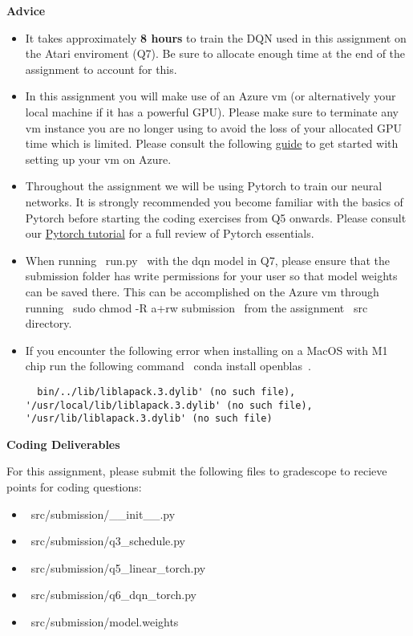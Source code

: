 \textbf{Advice}
\begin{itemize}
  \item It takes approximately \textbf{8 hours} to train the DQN used in this assignment on the Atari enviroment (Q7). Be sure to allocate enough time at the end of the assignment to account for this.

  \item In this assignment you will make use of an Azure vm (or alternatively your local machine if it has a powerful GPU). Please make sure to terminate any vm instance you are no longer using to avoid the loss of your allocated GPU time which is limited. Please consult the following \href{https://github.com/scpd-proed/XCS234-Handouts/blob/main/Azure/Azure%20Guide.pdf}{guide} to get started with setting up your vm on Azure.

  \item Throughout the assignment we will be using Pytorch to train our neural networks. It is strongly recommended you become familiar with the basics of Pytorch before starting the coding exercises from Q5 onwards. Please consult our \href{https://colab.research.google.com/drive/1BZ89PnXpzN2US_OxwuQCazucmuTpuIfS?usp=sharing}{Pytorch tutorial} for a full review of Pytorch essentials.

  \item When running ~run.py~ with the dqn model in Q7, please ensure that the submission folder has write permissions for your user so that model weights can be saved there. This can be accomplished on the Azure vm through running ~sudo chmod -R a+rw submission~ from the assignment ~src~ directory.

  \item If you encounter the following error when installing on a MacOS with M1 chip run the following command ~conda install openblas~.

  \begin{lstlisting}
  bin/../lib/liblapack.3.dylib' (no such file), '/usr/local/lib/liblapack.3.dylib' (no such file), '/usr/lib/liblapack.3.dylib' (no such file)
  \end{lstlisting}
\end{itemize}


\textbf{Coding Deliverables}

For this assignment, please submit the following files to gradescope to recieve points for coding questions:
\begin{itemize}
    \item ~src/submission/__init__.py~
    \item ~src/submission/q3_schedule.py~
    \item ~src/submission/q5_linear_torch.py~
    \item ~src/submission/q6_dqn_torch.py~
    \item ~src/submission/model.weights~
\end{itemize}
